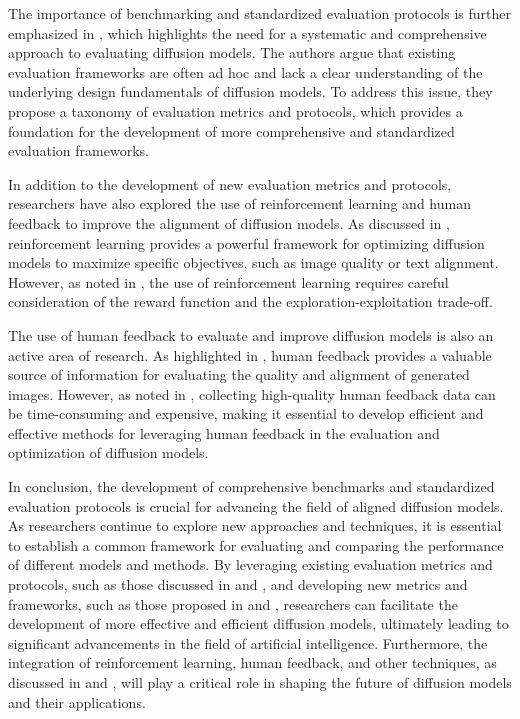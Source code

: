 \documentclass[11pt,a4paper]{article}
\begin{document}
The importance of benchmarking and standardized evaluation protocols is further emphasized in \cite{arxiv:2306.04542}, which highlights the need for a systematic and comprehensive approach to evaluating diffusion models. The authors argue that existing evaluation frameworks are often ad hoc and lack a clear understanding of the underlying design fundamentals of diffusion models. To address this issue, they propose a taxonomy of evaluation metrics and protocols, which provides a foundation for the development of more comprehensive and standardized evaluation frameworks.

In addition to the development of new evaluation metrics and protocols, researchers have also explored the use of reinforcement learning and human feedback to improve the alignment of diffusion models. As discussed in \cite{arxiv:2305.13301}, reinforcement learning provides a powerful framework for optimizing diffusion models to maximize specific objectives, such as image quality or text alignment. However, as noted in \cite{arxiv:2401.12244}, the use of reinforcement learning requires careful consideration of the reward function and the exploration-exploitation trade-off.

The use of human feedback to evaluate and improve diffusion models is also an active area of research. As highlighted in \cite{arxiv:2407.01648}, human feedback provides a valuable source of information for evaluating the quality and alignment of generated images. However, as noted in \cite{doi:10.1109/cvpr52734.2025.00750}, collecting high-quality human feedback data can be time-consuming and expensive, making it essential to develop efficient and effective methods for leveraging human feedback in the evaluation and optimization of diffusion models.

In conclusion, the development of comprehensive benchmarks and standardized evaluation protocols is crucial for advancing the field of aligned diffusion models. As researchers continue to explore new approaches and techniques, it is essential to establish a common framework for evaluating and comparing the performance of different models and methods. By leveraging existing evaluation metrics and protocols, such as those discussed in \cite{arxiv:2502.06805} and \cite{doi:10.1109/tkde.2024.3361474}, and developing new metrics and frameworks, such as those proposed in \cite{arxiv:2406.08070} and \cite{arxiv:2501.18865}, researchers can facilitate the development of more effective and efficient diffusion models, ultimately leading to significant advancements in the field of artificial intelligence. Furthermore, the integration of reinforcement learning, human feedback, and other techniques, as discussed in \cite{arxiv:2402.16359} and \cite{arxiv:2510.17136}, will play a critical role in shaping the future of diffusion models and their applications.
\end{document}

